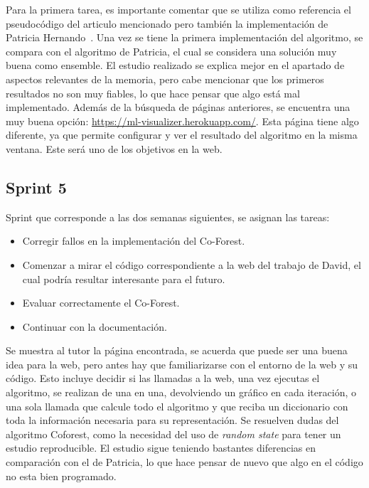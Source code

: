 Para la primera tarea, es importante comentar que se utiliza como referencia el pseudocódigo del articulo mencionado pero también la implementación de Patricia Hernando~\cite{TFG:Patricia}. 
Una vez se tiene la primera implementación del algoritmo, se compara con el algoritmo de Patricia, el cual se considera una solución muy buena como ensemble.
El estudio realizado se explica mejor en el apartado de aspectos relevantes de la memoria, pero cabe mencionar que los primeros resultados no son muy fiables, lo que hace pensar que algo está mal implementado.
Además de la búsqueda de páginas anteriores, se encuentra una muy buena opción: \url{https://ml-visualizer.herokuapp.com/}. Esta página tiene algo diferente, ya que permite configurar y ver el resultado del algoritmo en la misma ventana. Este será uno de los objetivos en la web.

\subsection{Sprint 5}
Sprint que corresponde a las dos semanas siguientes, se asignan las tareas:
\begin{itemize}
	\item Corregir fallos en la implementación del Co-Forest.
	\item Comenzar a mirar el código correspondiente a la web del trabajo de David, el cual podría resultar interesante para el futuro.
	\item Evaluar correctamente el Co-Forest.
	\item Continuar con la documentación.
\end{itemize}

Se muestra al tutor la página encontrada, se acuerda que puede ser una buena idea para la web, pero antes hay que familiarizarse con el entorno de la web y su código. Esto incluye decidir si las llamadas a la web, una vez ejecutas el algoritmo, se realizan de una en una, devolviendo un gráfico en cada iteración, o una sola llamada que calcule todo el algoritmo y que reciba un diccionario con toda la información necesaria para su representación. Se resuelven dudas del algoritmo Coforest, como la necesidad del uso de \textit{random state} para tener un estudio reproducible. El estudio sigue teniendo bastantes diferencias en comparación con el de Patricia, lo que hace pensar de nuevo que algo en el código no esta bien programado.

